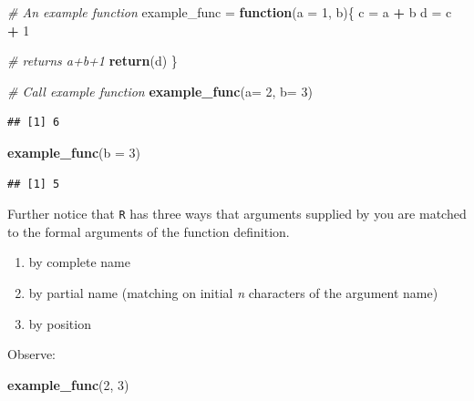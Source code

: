 \documentclass[
]{book}
\newenvironment{Shaded}{\begin{snugshade}}{\end{snugshade}}
\newcommand{\CommentTok}[1]{\textcolor[rgb]{0.56,0.35,0.01}{\textit{#1}}}
\newcommand{\ControlFlowTok}[1]{\textcolor[rgb]{0.13,0.29,0.53}{\textbf{#1}}}
\newcommand{\DataTypeTok}[1]{\textcolor[rgb]{0.13,0.29,0.53}{#1}}
\newcommand{\DecValTok}[1]{\textcolor[rgb]{0.00,0.00,0.81}{#1}}
\newcommand{\KeywordTok}[1]{\textcolor[rgb]{0.13,0.29,0.53}{\textbf{#1}}}
\newcommand{\NormalTok}[1]{#1}
\newcommand{\OperatorTok}[1]{\textcolor[rgb]{0.81,0.36,0.00}{\textbf{#1}}}
\newcommand{\StringTok}[1]{\textcolor[rgb]{0.31,0.60,0.02}{#1}}
\begin{document}
\begin{Shaded}
\begin{Highlighting}[]
\CommentTok{# An example function }
\NormalTok{example_func =}\StringTok{ }\ControlFlowTok{function}\NormalTok{(}\DataTypeTok{a =} \DecValTok{1}\NormalTok{, b)\{}
\NormalTok{  c =}\StringTok{ }\NormalTok{a }\OperatorTok{+}\StringTok{ }\NormalTok{b}
\NormalTok{  d =}\StringTok{ }\NormalTok{c }\OperatorTok{+}\StringTok{ }\DecValTok{1}
  
  \CommentTok{# returns a+b+1}
  \KeywordTok{return}\NormalTok{(d)}
\NormalTok{\}}

\CommentTok{# Call example function}
\KeywordTok{example_func}\NormalTok{(}\DataTypeTok{a=} \DecValTok{2}\NormalTok{, }\DataTypeTok{b=} \DecValTok{3}\NormalTok{)}
\end{Highlighting}
\end{Shaded}

\begin{verbatim}
## [1] 6
\end{verbatim}

\begin{Shaded}
\begin{Highlighting}[]
\KeywordTok{example_func}\NormalTok{(}\DataTypeTok{b =} \DecValTok{3}\NormalTok{)}
\end{Highlighting}
\end{Shaded}

\begin{verbatim}
## [1] 5
\end{verbatim}

Further notice that \texttt{R} has three ways that arguments supplied by you are matched to the formal arguments of the function definition.

\begin{enumerate}
\def\labelenumi{\arabic{enumi})}
\item
  by complete name
\item
  by partial name (matching on initial \emph{n} characters of the argument name)
\item
  by position
\end{enumerate}

Observe:

\begin{Shaded}
\begin{Highlighting}[]
\KeywordTok{example_func}\NormalTok{(}\DecValTok{2}\NormalTok{, }\DecValTok{3}\NormalTok{)}
\end{Highlighting}
\end{Shaded}
\end{document}
